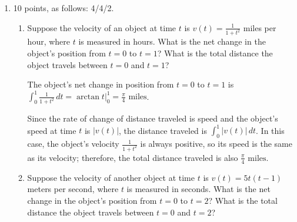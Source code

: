 \documentclass{article}
\begin{document}
\begin{enumerate}
\begin{enumerate}
  \end{enumerate}

\item 
\begin{grading}
10 points, as follows: 4/4/2.
\end{grading}

  \begin{enumerate}

  \item
    \begin{problem}[\vfill]
      Suppose the velocity of an object at time $t$ is $v(t) =
      \frac{1}{1+t^2}$ miles per hour, where $t$ is measured in hours.
      What is the net change in the object's position from $t=0$ to $t=1$?
      What is the total distance the object travels between $t = 0$ and $t
      = 1$?
    \end{problem}

    \begin{solution}
      The object's net change in position from $t = 0$ to $t = 1$ is
      $\displaystyle \int_0^1 \frac{1}{1 + t^2}\,dt = \arctan t \Big|_0^1
      = \boxed{\frac{\pi}{4} \text{ miles}}$.

      Since the rate of change of distance traveled is speed and the
      object's speed at time $t$ is $|v(t)|$, the distance traveled is
      $\displaystyle \int_0^1 |v(t)|\,dt$.  In this case, the object's
      velocity $\frac{1}{1 + t^2}$ is always positive, so its speed is the
      same as its velocity; therefore, the total distance traveled is also
      $\boxed{\frac{\pi}{4} \text{ miles}}$. 
    \end{solution}

  \item
    \begin{problem}[\vfill]
      Suppose the velocity of another object at time $t$ is $v(t) =
      5t(t-1)$ meters per second, where $t$ is measured in seconds.
      What is the net change in the object's position from $t=0$ to $t=2$?
      What is the total distance the object travels between $t = 0$ and $t
      = 2$?
    \end{problem}


\end{enumerate}
\end{enumerate}
\end{document}
